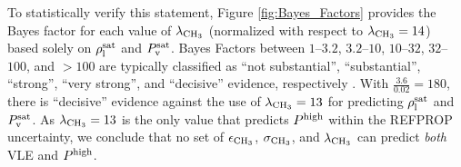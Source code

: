 \documentclass[preprint,letterpaper,floatfix,citeautoscript,aip,jcp]{revtex4-1}
\begin{document}
To statistically verify this statement, Figure \ref{fig:Bayes_Factors} provides the Bayes factor for each value of $\lambda_{\rm CH_3}$ (normalized with respect to $\lambda_{\rm CH_3} = 14$) based solely on $\rho_{\rm l}^{\rm sat}$ and $P_{\rm v}^{\rm sat}$. Bayes Factors between $1$--$3.2$, $3.2$--$10$, $10$--$32$, $32$--$100$, and $>100$ are typically classified as ``not substantial'', ``substantial'', ``strong'', ``very strong'', and ``decisive'' evidence, respectively \cite{Jeffreys2004}. With $\frac{3.6}{0.02} = 180$, there is ``decisive'' evidence against the use of $\lambda_{\rm CH_3} = 13$ for predicting $\rho_{\rm l}^{\rm sat}$ and $P_{\rm v}^{\rm sat}$. As $\lambda_{\rm CH_3} = 13$ is the only value that predicts $P^{\rm high}$ within the REFPROP uncertainty, we conclude that no set of $\epsilon_{\rm CH_3}$, $\sigma_{\rm CH_3}$, and $\lambda_{\rm CH_3}$ can predict \textit{both} VLE and $P^{\rm high}$. 


%
%


\end{document}
